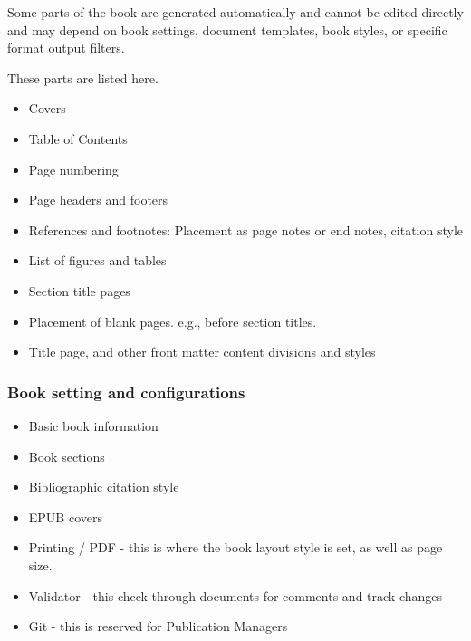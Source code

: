 \documentclass{article}
\begin{document}
Some parts of the book are generated automatically and cannot be edited directly and may depend on book settings, document templates, book styles, or specific format output filters. 


These parts are listed here.

\begin{itemize}
\item Covers


\item Table of Contents


\item Page numbering


\item Page headers and footers


\item References and footnotes: Placement as page notes or end notes, citation style


\item List of figures and tables


\item Section title pages


\item Placement of blank pages. e.g., before section titles.


\item Title page, and other front matter content divisions and styles


\end{itemize}

\subsubsection{Book setting and configurations}\label{H3989750}


\begin{itemize}
\item Basic book information


\item Book sections


\item Bibliographic citation style


\item EPUB covers


\item Printing / PDF - this is where the book layout style is set, as well as page size.


\item Validator - this check through documents for comments and track changes


\item Git - this is reserved for Publication Managers 


\end{itemize}
\end{document}
